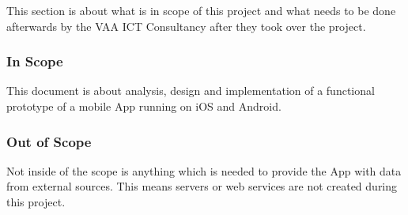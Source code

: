 This section is about what is in scope of this project and what needs to be done afterwards by the VAA ICT Consultancy after they took over the project.
\subsubsection{In Scope}
This document is about analysis, design and implementation of a functional prototype of a mobile App running on iOS and Android. 
\subsubsection{Out of Scope}
Not inside of the scope is anything which is needed to provide the App with data from external sources. This means servers or web services are not created during this project. 